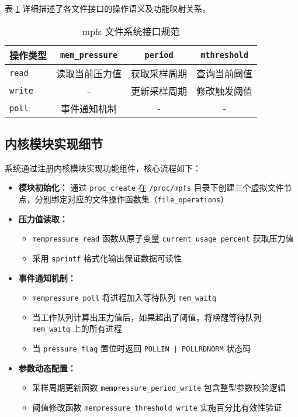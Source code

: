 表 \ref{tab:mpfs_files} 详细描述了各文件接口的操作语义及功能映射关系。

\begin{table}[H]
    \centering
    \caption{mpfs 文件系统接口规范}
    \label{tab:mpfs_files}
    \begin{tabular}{lccc}
        \toprule
        \textbf{操作类型} & \texttt{mem\_pressure} & \texttt{period} & \texttt{mthreshold} \\
        \midrule
        \texttt{read} & 读取当前压力值 & 获取采样周期 & 查询当前阈值 \\
        \texttt{write} & - & 更新采样周期 & 修改触发阈值 \\
        \texttt{poll} & 事件通知机制 & - & - \\
        \bottomrule
    \end{tabular}
\end{table}

\subsection{内核模块实现细节}

系统通过注册内核模块实现功能组件，核心流程如下：

\begin{itemize}
    \item \textbf{模块初始化：} 通过 \texttt{proc\_create} 在 \texttt{/proc/mpfs} 目录下创建三个虚拟文件节点，分别绑定对应的文件操作函数集（\texttt{file\_operations}）
  
    \item \textbf{压力值读取：}
    \begin{itemize}
        \item \texttt{mempressure\_read} 函数从原子变量 \texttt{current\_usage\_percent} 获取压力值
        \item 采用 \texttt{sprintf} 格式化输出保证数据可读性
    \end{itemize}

    \item \textbf{事件通知机制：}
    \begin{itemize}
        \item \texttt{mempressure\_poll} 将进程加入等待队列 \texttt{mem\_waitq}
        \item 当工作队列计算出压力值后，如果超出了阈值，将唤醒等待队列 \texttt{mem\_waitq} 上的所有进程
        \item 当 \texttt{pressure\_flag} 置位时返回 \texttt{POLLIN | POLLRDNORM} 状态码
    \end{itemize}

    \item \textbf{参数动态配置：}
    \begin{itemize}
        \item 采样周期更新函数 \texttt{mempressure\_period\_write} 包含整型参数校验逻辑
        \item 阈值修改函数 \texttt{mempressure\_threshold\_write} 实施百分比有效性验证
    \end{itemize}
\end{itemize}


